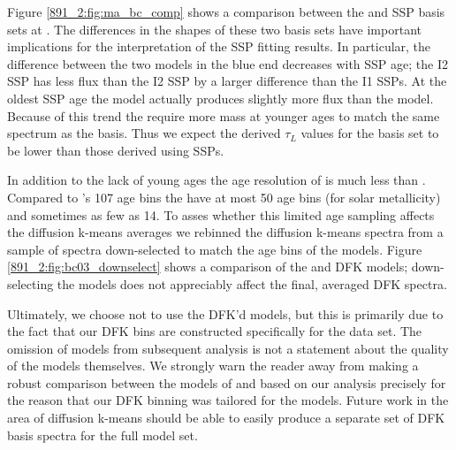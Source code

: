 Figure \ref{891_2:fig:ma_bc_comp} shows a comparison between the
 and  SSP basis sets at
. The differences in the shapes of these two basis sets
have important implications for the interpretation of the SSP fitting
results. In particular, the difference between the two models in the
blue end decreases with SSP age; the I2  SSP
has less flux than the I2  SSP by a larger
difference than the I1 SSPs. At the oldest SSP age the
 model actually produces slightly more flux
than the  model. Because of this trend the
 require more mass at younger ages to match the
same spectrum as the  basis. Thus we expect the
derived $\tau_L$ values for the  basis set to
be lower than those derived using  SSPs.


In addition to the lack of young ages the age resolution of
 is much less than
. Compared to 's 107 age
bins the  have at most 50 age bins (for solar
metallicity) and sometimes as few as 14. To asses whether this limited
age sampling affects the diffusion k-means averages we rebinned the
 diffusion k-means spectra from a sample of
 spectra down-selected to match the age bins of
the  models. Figure \ref{891_2:fig:bc03_downselect}
shows a comparison of the  and
 DFK models; down-selecting the
 models does not appreciably affect the final,
averaged DFK spectra.

Ultimately, we choose not to use the DFK'd 
models, but this is primarily due to the fact that our DFK bins are
constructed specifically for the  data set. The
omission of  models from subsequent analysis is
not a statement about the quality of the models themselves. We
strongly warn the reader away from making a robust comparison between
the models of  and  based
on our analysis precisely for the reason that our DFK binning was
tailored for the  models.  Future work in the
area of diffusion k-means should be able to easily produce a separate
set of DFK basis spectra for the full  model
set.

